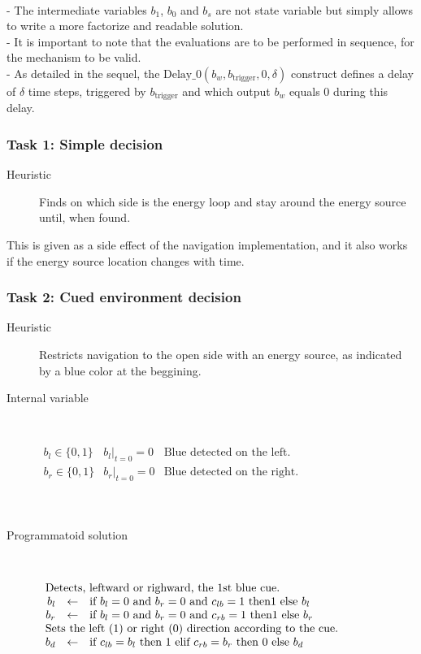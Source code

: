 \documentclass[a4]{article} \usepackage[left=2cm,right=3cm,top=1cm,bottom=2cm]{geometry}
\newcommand{\eqline}[1]{~\vspace{0.1cm}\\\centerline{$#1$}\vspace{0.1cm}\\}
\begin{document}
~\\- The intermediate variables $b_1$, $b_0$ and $b_s$ are not state variable but simply allows to write a more factorize and readable solution.
\\-  It is important to note that the evaluations are to be performed in sequence, for the mechanism to be valid.
\\- As detailed in the sequel, the $\mbox{Delay\_0}(b_w, b_{\mbox{trigger}}, 0, \delta)$ construct defines a delay of $\delta$ time steps, triggered by $b_{\mbox{trigger}}$ and which output $b_w$ equals $0$ during this delay.

\subsubsection{Task 1: Simple decision} \begin{description}
  \item[Heuristic]  Finds on which side is the energy loop and stay around the energy source until, when found.
\end{description}

This is given as a side effect of the navigation implementation, and it also works if the energy source location changes with time.

\subsubsection{Task 2: Cued environment decision} \begin{description}
\item[Heuristic] Restricts navigation to the open side with an energy source, as indicated by a blue color at the beggining.
    \item[Internal variable] \eqline{\begin{array}{lll}
        b_l \in \{0, 1\}  & \left. b_l \right|_{t = 0} = 0 & \mbox{Blue detected on the left.} \\
        b_r \in \{0, 1\}  & \left. b_r \right|_{t = 0} = 0 & \mbox{Blue detected on the right.} \\
    \end{array}}
    \item[Programmatoid solution] \eqline{\begin{array}{rcl}
        \multicolumn{3}{l}{\mbox{Detects, leftward or righward, the 1st blue cue.}} \\
        b_l &\leftarrow& \mbox{if }  b_l = 0 \mbox{ and } b_r = 0 \mbox{ and } c_{lb} = 1 \mbox{ then} 1 \mbox{ else } b_l \\
        b_r &\leftarrow& \mbox{if }  b_l = 0 \mbox{ and } b_r = 0 \mbox{ and } c_{rb} = 1 \mbox{ then} 1 \mbox{ else } b_r \\
        \multicolumn{3}{l}{\mbox{Sets the left (1) or right (0) direction according to the cue.}} \\
        b_d &\leftarrow& \mbox{if }  c_{lb} = b_l \mbox{ then } 1 \mbox{ elif } c_{rb} = b_r \mbox{ then } 0 \mbox{ else } b_d \\
\end{array}} \end{description}
\end{document}

